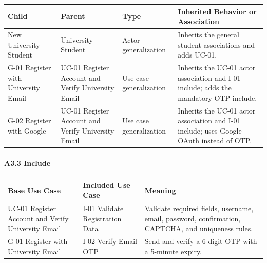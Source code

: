 \documentclass[12pt]{article}
\renewcommand{\baselinestretch}{1.5}
\begin{document}
\begingroup
\small
\renewcommand{\baselinestretch}{1.0}\selectfont
\renewcommand{\arraystretch}{1.15}
\setlength{\tabcolsep}{6pt}
\begin{longtable}{|>{\raggedright\arraybackslash}p{}|>{\raggedright\arraybackslash}p{}|>{\raggedright\arraybackslash}p{}|>{\raggedright\arraybackslash}p{}|}
\hline
\textbf{Child} & \textbf{Parent} & \textbf{Type} & \textbf{Inherited Behavior or Association} \\ \hline
\endhead
New University Student & University Student & Actor generalization & Inherits the general student associations and adds UC-01. \\ \hline
G-01 Register with University Email & UC-01 Register Account and Verify University Email & Use case generalization & Inherits the UC-01 actor association and I-01 include; adds the mandatory OTP include. \\ \hline
G-02 Register with Google & UC-01 Register Account and Verify University Email & Use case generalization & Inherits the UC-01 actor association and I-01 include; uses Google OAuth instead of OTP. \\ \hline
\end{longtable}
\endgroup
\par\medskip

\hypertarget{sec:a3-3-include}{}
\paragraph*{A3.3 Include}
\par\medskip

\begingroup
\small
\renewcommand{\baselinestretch}{1.0}\selectfont
\renewcommand{\arraystretch}{1.15}
\setlength{\tabcolsep}{6pt}
\begin{longtable}{|>{\raggedright\arraybackslash}p{}|>{\raggedright\arraybackslash}p{}|>{\raggedright\arraybackslash}p{}|}
\hline
\textbf{Base Use Case} & \textbf{Included Use Case} & \textbf{Meaning} \\ \hline
\endhead
UC-01 Register Account and Verify University Email & I-01 Validate Registration Data & Validate required fields, username, email, password, confirmation, CAPTCHA, and uniqueness rules. \\ \hline
G-01 Register with University Email & I-02 Verify Email OTP & Send and verify a 6-digit OTP with a 5-minute expiry. \\ \hline
\end{longtable}
\endgroup
\par\medskip
\end{document}
